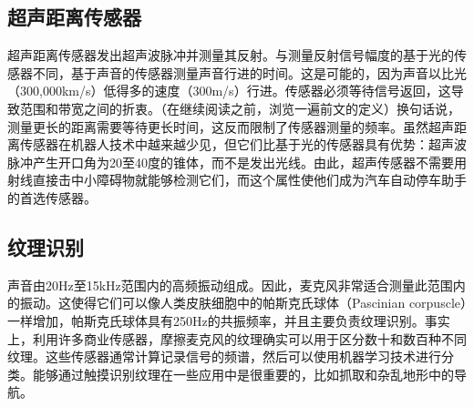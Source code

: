 \subsection{超声距离传感器}
超声距离传感器发出超声波脉冲并测量其反射。与测量反射信号幅度的基于光的传感器不同，基于声音的传感器测量声音行进的时间。这是可能的，因为声音以比光（300,000km/s）低得多的速度（300m/s）行进。传感器必须等待信号返回，这导致范围和带宽之间的折衷。（在继续阅读之前，浏览一遍前文的定义）换句话说，测量更长的距离需要等待更长时间，这反而限制了传感器测量的频率。虽然超声距离传感器在机器人技术中越来越少见，但它们比基于光的传感器具有优势：超声波脉冲产生开口角为20至40度的锥体，而不是发出光线。由此，超声传感器不需要用射线直接击中小障碍物就能够检测它们，而这个属性使他们成为汽车自动停车助手的首选传感器。



\subsection{纹理识别}
声音由20Hz至15kHz范围内的高频振动组成。因此，麦克风非常适合测量此范围内的振动。这使得它们可以像人类皮肤细胞中的帕斯克氏球体（Pascinian corpuscle）一样增加，帕斯克氏球体具有250Hz的共振频率，并且主要负责纹理识别。事实上，利用许多商业传感器，摩擦麦克风的纹理确实可以用于区分数十和数百种不同纹理\cite{hughes14}。这些传感器通常计算记录信号的频谱，然后可以使用机器学习技术进行分类。能够通过触摸识别纹理在一些应用中是很重要的，比如抓取和杂乱地形中的导航。



